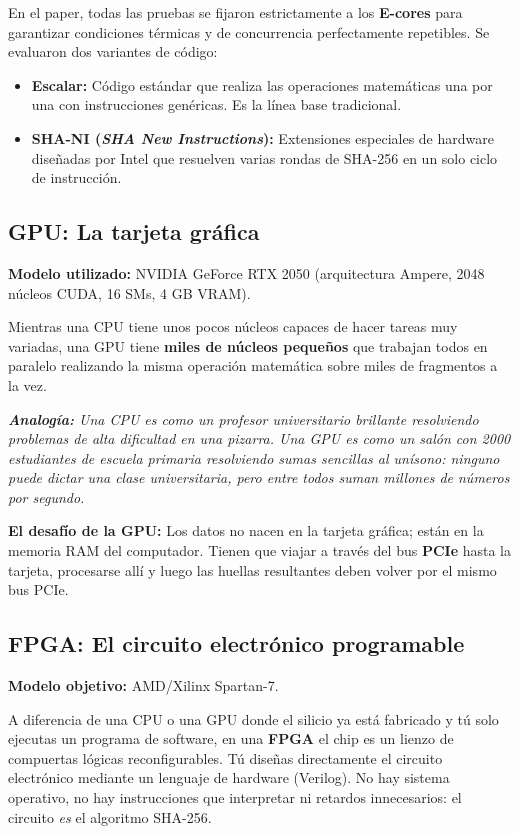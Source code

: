 \documentclass[11pt,a4paper]{article}
\newcommand{\destacado}[1]{%
    \par\vspace{0.8em}%
    \noindent\colorbox{boxbg}{%
        \parbox{\dimexpr\textwidth-2\fboxsep\relax}{%
            \vspace{0.4em}%
            \raggedright\itshape #1%
            \vspace{0.4em}%
        }%
    }%
    \par\vspace{0.8em}%
}
\begin{document}
En el paper, todas las pruebas se fijaron estrictamente a los \textbf{E-cores} para garantizar condiciones térmicas y de concurrencia perfectamente repetibles. Se evaluaron dos variantes de código:
\begin{itemize}[leftmargin=*]
    \item \textbf{Escalar:} Código estándar que realiza las operaciones matemáticas una por una con instrucciones genéricas. Es la línea base tradicional.
    \item \textbf{SHA-NI (\emph{SHA New Instructions}):} Extensiones especiales de hardware diseñadas por Intel que resuelven varias rondas de SHA-256 en un solo ciclo de instrucción.
\end{itemize}

\subsection{GPU: La tarjeta gráfica}
\textbf{Modelo utilizado:} NVIDIA GeForce RTX 2050 (arquitectura Ampere, 2048 núcleos CUDA, 16 SMs, 4 GB VRAM).

Mientras una CPU tiene unos pocos núcleos capaces de hacer tareas muy variadas, una GPU tiene \textbf{miles de núcleos pequeños} que trabajan todos en paralelo realizando la misma operación matemática sobre miles de fragmentos a la vez.

\destacado{\textbf{Analogía:} Una CPU es como un profesor universitario brillante resolviendo problemas de alta dificultad en una pizarra. Una GPU es como un salón con 2000 estudiantes de escuela primaria resolviendo sumas sencillas al unísono: ninguno puede dictar una clase universitaria, pero entre todos suman millones de números por segundo.}

\textbf{El desafío de la GPU:} Los datos no nacen en la tarjeta gráfica; están en la memoria RAM del computador. Tienen que viajar a través del bus \textbf{PCIe} hasta la tarjeta, procesarse allí y luego las huellas resultantes deben volver por el mismo bus PCIe.

\subsection{FPGA: El circuito electrónico programable}
\textbf{Modelo objetivo:} AMD/Xilinx Spartan-7.

A diferencia de una CPU o una GPU donde el silicio ya está fabricado y tú solo ejecutas un programa de software, en una \textbf{FPGA} el chip es un lienzo de compuertas lógicas reconfigurables. Tú diseñas directamente el circuito electrónico mediante un lenguaje de hardware (Verilog). No hay sistema operativo, no hay instrucciones que interpretar ni retardos innecesarios: el circuito \emph{es} el algoritmo SHA-256.
\end{document}
